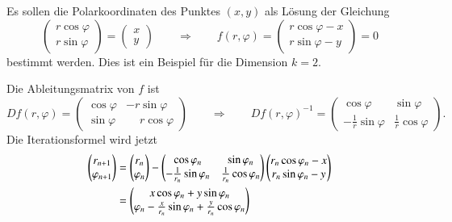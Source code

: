 \begin{beispiel}
Es sollen die Polarkoordinaten des Punktes $(x,y)$
als Lösung der Gleichung
\[
\begin{pmatrix}
r\cos\varphi\\r\sin\varphi
\end{pmatrix}
=
\begin{pmatrix}x\\y\end{pmatrix}
\qquad\Rightarrow\qquad
f(r,\varphi) =\begin{pmatrix}r\cos\varphi -x \\ r\sin\varphi -y \end{pmatrix}
=0
\]
bestimmt werden.
Dies ist ein Beispiel für die Dimension $k=2$.

Die Ableitungsmatrix von $f$ ist
\[
Df(r,\varphi)
=
\begin{pmatrix}
\cos\varphi&-r \sin\varphi\\
\sin\varphi&\phantom{-} r \cos\varphi
\end{pmatrix}
\qquad\Rightarrow\qquad
Df(r,\varphi)^{-1}
=
\begin{pmatrix}
\cos\varphi&\sin\varphi\\
-\frac1r\sin\varphi&\frac1r\cos\varphi
\end{pmatrix}.
\]
Die Iterationsformel wird jetzt
\begin{align}
\begin{pmatrix}
r_{n+1}\\
\varphi_{n+1}
\end{pmatrix}
&=
\begin{pmatrix}r_n\\\varphi_n\end{pmatrix}
-
\begin{pmatrix}
\cos\varphi_n&\sin\varphi_n\\
-\frac1{r_n}\sin\varphi_n&\frac1{r_n}\cos\varphi_n
\end{pmatrix}
\begin{pmatrix}
r_n\cos\varphi_n-x\\
r_n\sin\varphi_n-y
\end{pmatrix}
\notag
\\
&=
\begin{pmatrix}
x\cos\varphi_n+y\sin\varphi_n\\
\varphi_n -\frac{x}{r_n}\sin\varphi_n+\frac{y}{r_n}\cos\varphi_n
\end{pmatrix}
\label{buch:equation:polar}
\end{align}
\begin{table}

\end{table}
\end{beispiel}
